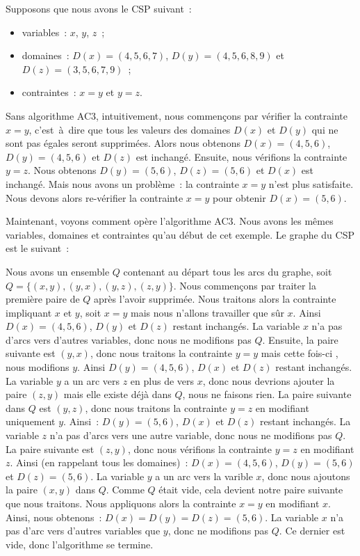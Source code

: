 \begin{example}
\label{example:data:ac3}

Supposons que nous avons le CSP suivant~:
%
\begin{itemize}

\item variables~: $x$, $y$, $z$~;

\item domaines~: $D(x) = (4, 5, 6, 7)$, $D(y) = (4, 5, 6, 8, 9)$ et $D(z) = (3,
5, 6, 7, 9)$~;

\item contraintes~: $x = y$ et $y = z$.

\end{itemize}

Sans algorithme AC3, intuitivement, nous commençons par vérifier la contrainte
$x = y$, c'est~à~dire que tous les valeurs des domaines $D(x)$ et $D(y)$ qui ne
sont pas égales seront supprimées. Alors nous obtenons $D(x) = (4, 5, 6)$, $D(y)
= (4, 5, 6)$ et $D(z)$ est inchangé. Ensuite, nous vérifions la contrainte $y =
z$. Nous obtenons $D(y) = (5, 6)$, $D(z) = (5, 6)$ et $D(x)$ est inchangé. Mais
nous avons un problème~: la contrainte $x = y$ n'est plus satisfaite. Nous
devons alors re-vérifier la contrainte $x = y$ pour obtenir $D(x) = (5, 6)$.

Maintenant, voyons comment opère l'algorithme AC3. Nous avons les mêmes
variables, domaines et contraintes qu'au début de cet exemple. Le graphe du CSP
est le suivant~:


Nous avons un ensemble $Q$ contenant au départ tous les arcs du graphe, soit $Q
= \{(x, y), (y, x), (y, z), (z, y)\}$. Nous commençons par traiter la première
paire de $Q$ après l'avoir supprimée. Nous traitons alors la contrainte
impliquant $x$ et $y$, soit $x = y$ mais nous n'allons travailler que sûr $x$.
Ainsi $D(x) = (4, 5, 6)$, $D(y)$ et $D(z)$ restant inchangés. La variable $x$
n'a pas d'arcs vers d'autres variables, donc nous ne modifions pas $Q$. Ensuite,
la paire suivante est $(y, x)$, donc nous traitons la contrainte $y = y$ mais
cette fois-ci , nous modifions $y$. Ainsi
$D(y) = (4, 5, 6)$, $D(x)$ et $D(z)$ restant inchangés. La variable $y$ a un arc
vers $z$ en plus de vers $x$, donc nous devrions ajouter la paire $(z, y)$ mais
elle existe déjà dans $Q$, nous ne faisons rien. La paire suivante dans $Q$ est
$(y, z)$, donc nous traitons la contrainte $y = z$ en modifiant uniquement $y$.
Ainsi~: $D(y) = (5, 6)$, $D(x)$ et $D(z)$ restant inchangés. La variable $z$ n'a
pas d'arcs vers une autre variable, donc nous ne modifions pas $Q$. La paire
suivante est $(z, y)$, donc nous vérifions la contrainte $y = z$ en modifiant
$z$. Ainsi (en rappelant tous les domaines)~: $D(x) = (4, 5, 6)$, $D(y) = (5,
6)$ et $D(z) = (5, 6)$. La variable $y$ a un arc vers la varible $x$, donc nous
ajoutons la paire $(x, y)$ dans $Q$. Comme $Q$ était vide, cela devient notre
paire suivante que nous traitons. Nous appliquons alors la contrainte $x = y$ en
modifiant $x$. Ainsi, nous obtenons~: $D(x) = D(y) = D(z) = (5, 6)$. La variable
$x$ n'a pas d'arc vers d'autres variables que $y$, donc ne modifions pas $Q$. Ce
dernier est vide, donc l'algorithme se termine.


\end{example}
